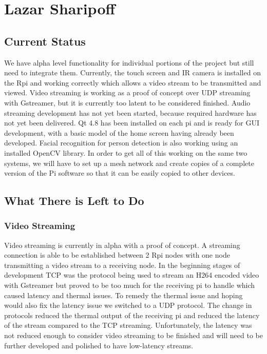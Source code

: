 \documentclass[onecolumn, draftclsnofoot,10pt, compsoc]{IEEEtran}
\begin{document}
\section{Lazar Sharipoff}
\subsection{Current Status}
	We have alpha level functionality for individual portions of the project but still need to integrate them. Currently, the touch screen and IR camera is installed on the Rpi and working correctly which allows a video stream to be transmitted and viewed. Video streaming is working as a proof of concept over UDP streaming with Gstreamer, but it is currently too latent to be considered finished. Audio streaming development has not yet been started, because required hardware has not yet been delivered. Qt 4.8 has been installed on each pi and is ready for GUI development, with a basic model of the home screen having already been developed. Facial recognition for person detection is also working using an installed OpenCV library. In order to get all of this working on the same two systems, we will have to set up a mesh network and create copies of a complete version of the Pi software so that it can be easily copied to other devices. 


\subsection{What There is Left to Do}
\subsubsection{Video Streaming}
	Video streaming is currently in alpha with a proof of concept. A streaming connection is able to be established between 2 Rpi nodes with one node transmitting a video stream to a receiving node. In the beginning stages of development TCP was the protocol being used to stream an H264 encoded video with Gstreamer but proved to be too much for the receiving pi to handle which caused latency and thermal issues. To remedy the thermal issue and hoping would also fix the latency issue we switched to a UDP protocol. The change in protocols reduced the thermal output of the receiving pi and reduced the latency of the stream compared to the TCP streaming. Unfortunately, the latency was not reduced enough to consider video streaming to be finished and will need to be further developed and polished to have low-latency streams.
	
\end{document}
